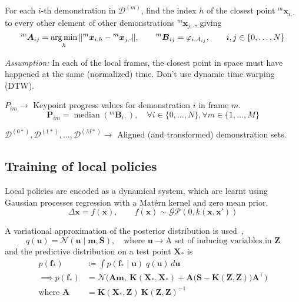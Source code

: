 For each \( i \)-th demonstration in \( \mathcal{D}^{(m)} \), find the index \( h \) of the closest point \( {}^{m}\boldsymbol{x}_{i, \cdot} \) to every other element of other demonstrations \( {}^{m}\boldsymbol{x}_{j, \cdot} \), giving
\begin{equation}
    {}^{m}\boldsymbol{A}_{ij} = \operatorname*{arg\,min}_{h} \Vert {}^{m}\boldsymbol{x}_{i, h} - {}^{m}\boldsymbol{x}_{j, \cdot} \Vert
    , \qquad
    {}^{m}\boldsymbol{B}_{ij} = \varphi_{i, A_{ij}}
    , \qquad
    i, j \in \{ 0, \ldots, N \}
\end{equation}

\textit{Assumption:} In each of the local frames, the closest point in space must have happened at the same (normalized) time.
Don't use dynamic time warping (DTW).

\( P_{im} \to \) Keypoint progress values for demonstration \( i \) in frame \( m \).
\begin{equation}
    \boldsymbol{P}_{im} = \operatorname{median}({}^{m}\boldsymbol{B}_{i\cdot}), \quad \forall i \in \{ 0, \ldots, N \}, \forall m \in \{ 1, \ldots, M \}
\end{equation}

\( \mathcal{D}^{(0*)}, \mathcal{D}^{(1*)}, \ldots, \mathcal{D}^{(M*)} \to \) Aligned (and transformed) demonstration sets.

\subsection{Training of local policies}\label{sec:local-policies}

Local policies are encoded as a dynamical system, which are learnt using Gaussian processes regression with a Mat\'{e}rn kernel and zero mean prior.
\begin{equation}
    \Delta \boldsymbol{x} = f(\boldsymbol{x})
    , \qquad
    f(\boldsymbol{x}) \sim \mathcal{GP}(0, k(\boldsymbol{x}, \boldsymbol{x}'))
\end{equation}

A variational approximation of the posterior distribution is used~\cite{pmlr-v38-hensman15},
\begin{equation}
    q(\boldsymbol{u}) = \mathcal{N}(\boldsymbol{u} \mid \boldsymbol{m}, \boldsymbol{S}), \quad \text{where } \boldsymbol{u} \to \text{A set of inducing variables in } \boldsymbol{Z}
\end{equation}
and the predictive distribution on a test point \( \boldsymbol{X}_* \) is
\begin{align}
    p(\boldsymbol{f}_*)
     & \coloneq
    \int p(\boldsymbol{f}_* \mid \boldsymbol{u}) \; q(\boldsymbol{u}) \, d\boldsymbol{u}
    \\
    \implies
    p(\boldsymbol{f}_*)
     & =
    \mathcal{N} \Big( \boldsymbol{A} \boldsymbol{m}, \ \boldsymbol{K}(\boldsymbol{X}_*, \boldsymbol{X}_*) + \boldsymbol{A} \big( \boldsymbol{S} - \boldsymbol{K}(\boldsymbol{Z}, \boldsymbol{Z}) \big) \boldsymbol{A}^\top \Big)
    \\
    \text{where }
    \boldsymbol{A}
     & =
    \boldsymbol{K}(\boldsymbol{X}_*, \boldsymbol{Z}) \ {\boldsymbol{K}(\boldsymbol{Z}, \boldsymbol{Z})}^{-1}
\end{align}

